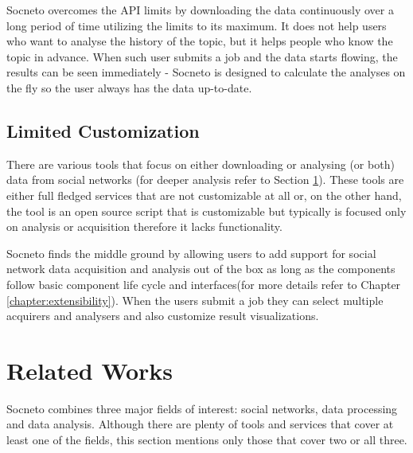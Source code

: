 Socneto overcomes the API limits by downloading the data continuously over a long period of time utilizing the limits to its maximum. It does not help users who want to analyse the history of the topic, but it helps people who know the topic in advance. When such user submits a job and the data starts flowing, the results can be seen immediately - Socneto is designed to calculate the analyses on the fly so the user always has the data up-to-date.


\subsection{Limited Customization}

There are various tools that focus on either downloading or analysing (or both) data from social networks (for deeper analysis refer to Section \ref{section:relatedWork}). These tools are either full fledged services that are not customizable at all or, on the other hand, the tool is an open source script that is customizable but typically is focused only on analysis or acquisition therefore it lacks functionality.

Socneto finds the middle ground by allowing users to add support for social network data acquisition and analysis out of the box as long as the components follow basic component life cycle and interfaces(for more details refer to Chapter \ref{chapter:extensibility}). When the users submit a job they can select multiple acquirers and analysers and also customize result visualizations.



\section{Related Works}\label{section:relatedWork}

Socneto combines three major fields of interest: social networks, data processing and data analysis. Although there are plenty of tools and services that cover at least one of the fields, this section mentions only those that cover two or all three.

